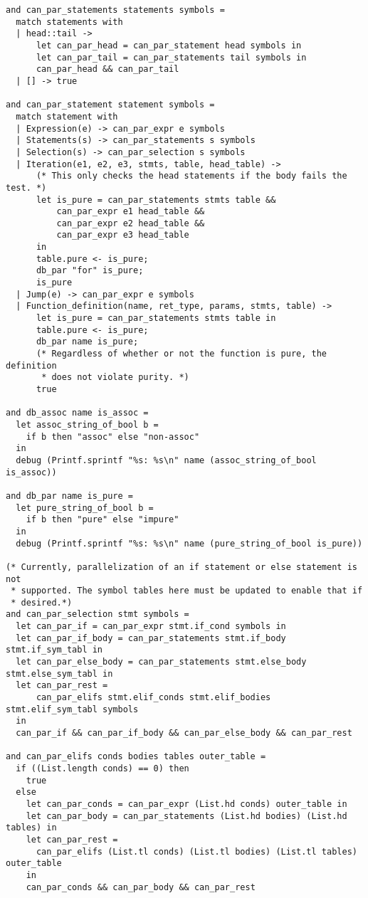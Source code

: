 \begin{verbatim}
and can_par_statements statements symbols =
  match statements with
  | head::tail ->
      let can_par_head = can_par_statement head symbols in
      let can_par_tail = can_par_statements tail symbols in
      can_par_head && can_par_tail
  | [] -> true

and can_par_statement statement symbols =
  match statement with
  | Expression(e) -> can_par_expr e symbols
  | Statements(s) -> can_par_statements s symbols
  | Selection(s) -> can_par_selection s symbols
  | Iteration(e1, e2, e3, stmts, table, head_table) ->
      (* This only checks the head statements if the body fails the test. *)
      let is_pure = can_par_statements stmts table &&
          can_par_expr e1 head_table &&
          can_par_expr e2 head_table &&
          can_par_expr e3 head_table
      in
      table.pure <- is_pure;
      db_par "for" is_pure;
      is_pure
  | Jump(e) -> can_par_expr e symbols
  | Function_definition(name, ret_type, params, stmts, table) ->
      let is_pure = can_par_statements stmts table in
      table.pure <- is_pure;
      db_par name is_pure;
      (* Regardless of whether or not the function is pure, the definition
       * does not violate purity. *)
      true

and db_assoc name is_assoc =
  let assoc_string_of_bool b =
    if b then "assoc" else "non-assoc"
  in
  debug (Printf.sprintf "%s: %s\n" name (assoc_string_of_bool is_assoc))

and db_par name is_pure =
  let pure_string_of_bool b =
    if b then "pure" else "impure"
  in
  debug (Printf.sprintf "%s: %s\n" name (pure_string_of_bool is_pure))

(* Currently, parallelization of an if statement or else statement is not
 * supported. The symbol tables here must be updated to enable that if
 * desired.*)
and can_par_selection stmt symbols =
  let can_par_if = can_par_expr stmt.if_cond symbols in
  let can_par_if_body = can_par_statements stmt.if_body stmt.if_sym_tabl in
  let can_par_else_body = can_par_statements stmt.else_body stmt.else_sym_tabl in
  let can_par_rest =
      can_par_elifs stmt.elif_conds stmt.elif_bodies stmt.elif_sym_tabl symbols
  in
  can_par_if && can_par_if_body && can_par_else_body && can_par_rest

and can_par_elifs conds bodies tables outer_table =
  if ((List.length conds) == 0) then
    true
  else
    let can_par_conds = can_par_expr (List.hd conds) outer_table in
    let can_par_body = can_par_statements (List.hd bodies) (List.hd tables) in
    let can_par_rest =
      can_par_elifs (List.tl conds) (List.tl bodies) (List.tl tables) outer_table
    in
    can_par_conds && can_par_body && can_par_rest


\end{verbatim}
